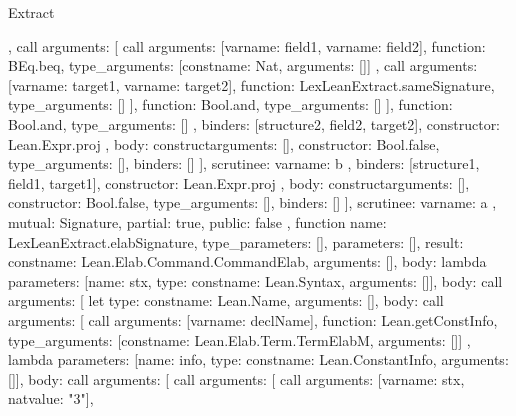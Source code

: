 \begin{lexlean}{Extract}
\begin{toolingmodule}
{{{{{{{{                      },
                      call{
                        arguments: [
                          call{
                            arguments: [var{name: field1}, var{name: field2}],
                            function: BEq.beq,
                            type_arguments: [const{name: Nat, arguments: []}]
                          },
                          call{
                            arguments: [var{name: target1}, var{name: target2}],
                            function: LexLeanExtract.sameSignature,
                            type_arguments: []
                          }
                        ],
                        function: Bool.and,
                        type_arguments: []
                      }
                    ],
                    function: Bool.and,
                    type_arguments: []
                  },
                  binders: [structure2, field2, target2],
                  constructor: Lean.Expr.proj
                },
                {
                  body: construct{arguments: [], constructor: Bool.false, type_arguments: []},
                  binders: []
                }
              ],
              scrutinee: var{name: b}
            },
            binders: [structure1, field1, target1],
            constructor: Lean.Expr.proj
          },
          {body: construct{arguments: [], constructor: Bool.false, type_arguments: []}, binders: []}
        ],
        scrutinee: var{name: a}
      },
      mutual: Signature,
      partial: true,
      public: false
    },
    function{
      name: LexLeanExtract.elabSignature,
      type_parameters: [],
      parameters: [],
      result: const{name: Lean.Elab.Command.CommandElab, arguments: []},
      body: lambda{
        parameters: [{name: stx, type: const{name: Lean.Syntax, arguments: []}}],
        body: call{
          arguments: [
            let{
              type: const{name: Lean.Name, arguments: []},
              body: call{
                arguments: [
                  call{
                    arguments: [var{name: declName}],
                    function: Lean.getConstInfo,
                    type_arguments: [const{name: Lean.Elab.Term.TermElabM, arguments: []}]
                  },
                  lambda{
                    parameters: [{name: info, type: const{name: Lean.ConstantInfo, arguments: []}}],
                    body: call{
                      arguments: [
                        call{
                          arguments: [
                            call{
                              arguments: [var{name: stx}, nat{value: "3"}],
}}}}}}}}}}
\end{toolingmodule}
\end{lexlean}
